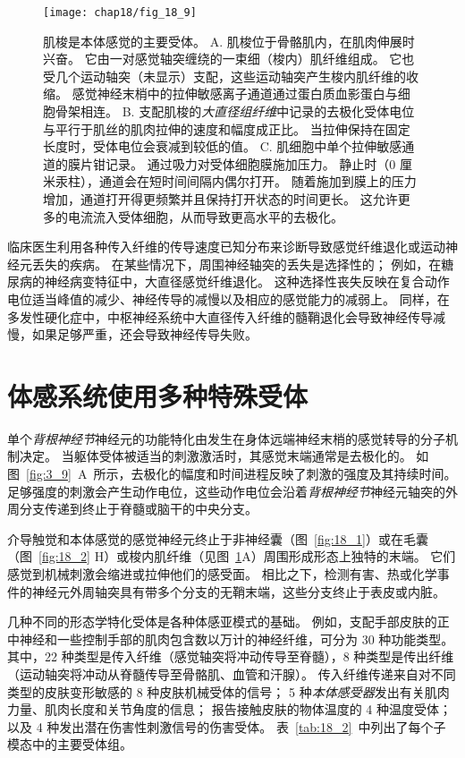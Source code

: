 \begin{figure}[htbp]
	\centering
	\texttt{[image: chap18/fig\_18\_9]}
	\caption{肌梭是本体感觉的主要受体。
		A. 肌梭位于骨骼肌内，在肌肉伸展时兴奋。
		它由一对感觉轴突缠绕的一束细（梭内）肌纤维组成。
		它也受几个运动轴突（未显示）支配，这些运动轴突产生梭内肌纤维的收缩。
		感觉神经末梢中的拉伸敏感离子通道通过蛋白质血影蛋白与细胞骨架相连\cite{sachs1992stretch}。
		B. 支配肌梭的\textit{大直径组纤维}中记录的去极化受体电位与平行于肌丝的肌肉拉伸的速度和幅度成正比。
		当拉伸保持在固定长度时，受体电位会衰减到较低的值\cite{cone1971transducer}。
		C. 肌细胞中单个拉伸敏感通道的膜片钳记录。
		通过吸力对受体细胞膜施加压力。
		静止时（0 厘米汞柱），通道会在短时间间隔内偶尔打开。 
		随着施加到膜上的压力增加，通道打开得更频繁并且保持打开状态的时间更长。
		这允许更多的电流流入受体细胞，从而导致更高水平的去极化\cite{guharay1984stretch}。}
	\label{fig:18_9}
\end{figure}


临床医生利用各种传入纤维的传导速度已知分布来诊断导致感觉纤维退化或运动神经元丢失的疾病。
在某些情况下，周围神经轴突的丢失是选择性的；
例如，在糖尿病的神经病变特征中，大直径感觉纤维退化。
这种选择性丧失反映在复合动作电位适当峰值的减少、神经传导的减慢以及相应的感觉能力的减弱上。
同样，在多发性硬化症中，中枢神经系统中大直径传入纤维的髓鞘退化会导致神经传导减慢，如果足够严重，还会导致神经传导失败。


\section{体感系统使用多种特殊受体}

单个\textit{背根神经节}神经元的功能特化由发生在身体远端神经末梢的感觉转导的分子机制决定。
当躯体受体被适当的刺激激活时，其感觉末端通常是去极化的。
如图~\ref{fig:3_9}~A~所示，去极化的幅度和时间进程反映了刺激的强度及其持续时间。
足够强度的刺激会产生动作电位，这些动作电位会沿着\textit{背根神经节}神经元轴突的外周分支传递到终止于脊髓或脑干的中央分支。


介导触觉和本体感觉的感觉神经元终止于非神经囊（图~\ref{fig:18_1}）或在毛囊（图~\ref{fig:18_2} H）或梭内肌纤维（见图~\ref{fig:18_9}A）周围形成形态上独特的末端。
它们感觉到机械刺激会缩进或拉伸他们的感受面。
相比之下，检测有害、热或化学事件的神经元外周轴突具有带多个分支的无鞘末端，这些分支终止于表皮或内脏。


几种不同的形态学特化受体是各种体感亚模式的基础。
例如，支配手部皮肤的正中神经和一些控制手部的肌肉包含数以万计的神经纤维，可分为 30 种功能类型。
其中，22 种类型是传入纤维（感觉轴突将冲动传导至脊髓），8 种类型是传出纤维（运动轴突将冲动从脊髓传导至骨骼肌、血管和汗腺）。
传入纤维传递来自对不同类型的皮肤变形敏感的 8 种皮肤机械受体的信号；
5 种\textit{本体感受器}发出有关肌肉力量、肌肉长度和关节角度的信息；
报告接触皮肤的物体温度的 4 种温度受体；
以及 4 种发出潜在伤害性刺激信号的伤害受体。
表~\ref{tab:18_2}~中列出了每个子模态中的主要受体组。


